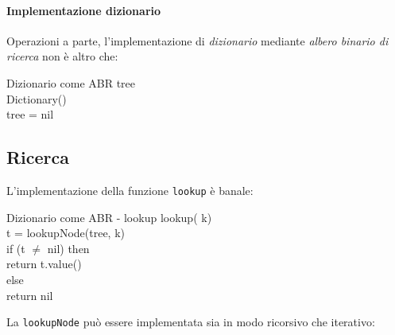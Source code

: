 \paragraph{Implementazione dizionario}
Operazioni a parte, l'implementazione di \emph{dizionario} mediante \emph{albero
binario di ricerca} non è altro che:
\begin{code}{Dizionario come ABR}
     tree\\

    \ind Dictionary()\\
        tree = nil
\end{code}

\subsection{Ricerca}
L'implementazione della funzione \texttt{lookup} è banale:
\begin{minicode}{Dizionario come ABR - lookup}
    \ind{} lookup( k)\\
     t = lookupNode(tree, k)\\
    \indf if (t $\neq$ nil) then\\
        return t.value()\\
    \indf else\\
        return nil
\end{minicode}\noindent
La \texttt{lookupNode} può essere implementata sia in modo ricorsivo che
iterativo:
